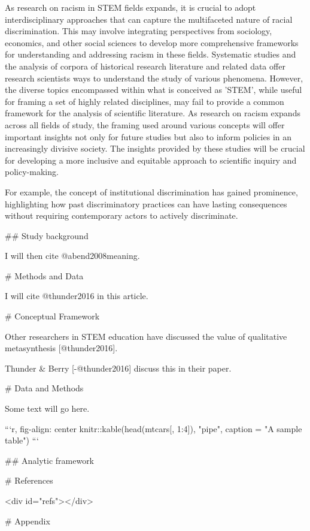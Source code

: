 As research on racism in STEM fields expands, it is crucial to adopt interdisciplinary approaches that can capture the multifaceted nature of racial discrimination. This may involve integrating perspectives from sociology, economics, and other social sciences to develop more comprehensive frameworks for understanding and addressing racism in these fields. Systematic studies and the analysis of corpora of historical research literature and related data offer research scientists ways to understand the study of various phenomena. However, the diverse topics encompassed within what is conceived as 'STEM', while useful for framing a set of highly related disciplines, may fail to provide a common framework for the analysis of scientific literature. As research on racism expands across all fields of study, the framing used around various concepts will offer important insights not only for future studies but also to inform policies in an increasingly divisive society. The insights provided by these studies will be crucial for developing a more inclusive and equitable approach to scientific inquiry and policy-making.


For example, the concept of institutional discrimination has gained prominence, highlighting how past discriminatory practices can have lasting consequences without requiring contemporary actors to actively discriminate.

## Study background

I will then cite @abend2008meaning.

# Methods and Data

I will cite @thunder2016 in this article.

# Conceptual Framework

Other researchers in STEM education have discussed the value of qualitative metasynthesis [@thunder2016].

Thunder & Berry [-@thunder2016] discuss this in their paper.

# Data and Methods

Some text will go here.

```{r, fig-align: center}
knitr::kable(head(mtcars[, 1:4]), "pipe",
             caption = "A sample table")
```

## Analytic framework

# References

<div id="refs"></div>

\newpage

# Appendix

